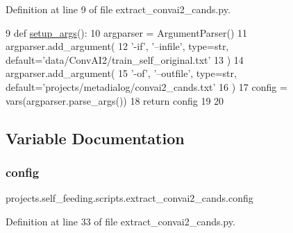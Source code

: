 Definition at line 9 of file extract\+\_\+convai2\+\_\+cands.\+py.


\begin{DoxyCode}
9 \textcolor{keyword}{def }\hyperlink{namespaceprojects_1_1self__feeding_1_1scripts_1_1extract__convai2__cands_a195803e64ff287a8e844a00e6a24ceef}{setup\_args}():
10     argparser = ArgumentParser()
11     argparser.add\_argument(
12         \textcolor{stringliteral}{'-if'}, \textcolor{stringliteral}{'--infile'}, type=str, default=\textcolor{stringliteral}{'data/ConvAI2/train\_self\_original.txt'}
13     )
14     argparser.add\_argument(
15         \textcolor{stringliteral}{'-of'}, \textcolor{stringliteral}{'--outfile'}, type=str, default=\textcolor{stringliteral}{'projects/metadialog/convai2\_cands.txt'}
16     )
17     config = vars(argparser.parse\_args())
18     \textcolor{keywordflow}{return} config
19 
20 
\end{DoxyCode}


\subsection{Variable Documentation}
\mbox{\label{namespaceprojects_1_1self__feeding_1_1scripts_1_1extract__convai2__cands_a127d0bf4e35dc3f7abdc031ee15ea333}} 
\subsubsection{\texorpdfstring{config}{config}}
{\footnotesize\ttfamily projects.\+self\+\_\+feeding.\+scripts.\+extract\+\_\+convai2\+\_\+cands.\+config}



Definition at line 33 of file extract\+\_\+convai2\+\_\+cands.\+py.

